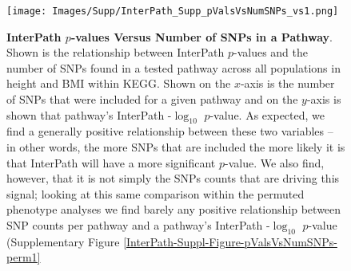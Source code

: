 \documentclass[12pt, a4paper]{article}
\begin{document}
\begin{figure}[htbp]
\centering
\texttt{[image: Images/Supp/InterPath\_Supp\_pValsVsNumSNPs\_vs1.png]}
\caption[TBD]{\textbf{InterPath $p$-values Versus Number of SNPs in a Pathway}. \\ Shown is the relationship between InterPath $p$-values and the number of SNPs found in a tested pathway across all populations in height and BMI within KEGG. Shown on the $x$-axis is the number of SNPs that were included for a given pathway and on the $y$-axis is shown that pathway's InterPath -$\log_{10}$ $p$-value. As expected, we find a generally positive relationship between these two variables -- in other words, the more SNPs that are included the more likely it is that InterPath will have a more significant $p$-value. We also find, however, that it is not simply the SNPs counts that are driving this signal; looking at this same comparison within the permuted phenotype analyses we find barely any positive relationship between SNP counts per pathway and a pathway's InterPath -$\log_{10}$ $p$-value (Supplementary Figure \ref{InterPath-Suppl-Figure-pValsVsNumSNPs-perm1}}
\label{InterPath-Suppl-Figure-pValsVsNumSNPs}
\end{figure}

\end{document}
